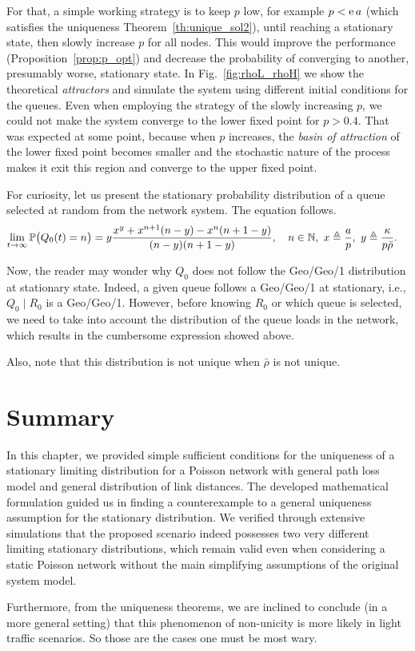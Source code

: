 For that, a simple working strategy is to keep $p$ low, for example $p < \mathrm{e}\,a$ (which satisfies the uniqueness Theorem~\ref{th:unique_sol2}), until reaching a stationary state, then slowly increase $p$ for all nodes. This would improve the performance (Proposition~\ref{prop:p_opt}) and decrease the probability of converging to another, presumably worse, stationary state.
%
In Fig.~\ref{fig:rhoL_rhoH} we show the theoretical \textit{attractors} and simulate the system using different initial conditions for the queues.
%
Even when employing the strategy of the slowly increasing $p$, we could not make the system converge to the lower fixed point for $p > 0.4$.
%
That was expected at some point, because when $p$ increases, the \textit{basin of attraction} of the lower fixed point becomes smaller and the stochastic nature of the process makes it exit this region and converge to the upper fixed point. %

\begin{note}
    For curiosity, let us present the stationary probability distribution of a queue selected at random from the network system. %
    The equation follows.
    \begin{align*}
        \lim_{t\to\infty}{\mathbb P}\big(Q_0(t) = n\big) &= y \frac{x^y + x^{n+1}(n-y) - x^n (n+1-y)}{(n-y)(n+1-y)}, \quad n\in{\mathbb N},~ x \triangleq \frac{a}{p}, ~ y \triangleq \frac{\kappa}{p\bar\rho}.
    \end{align*}
    
    Now, the reader may wonder why $Q_0$ does not follow the Geo/Geo/1 distribution at stationary state.
    Indeed, a given queue follows a Geo/Geo/1 at stationary, i.e., $Q_0 \mid R_0$ is a Geo/Geo/1.
    However, before knowing $R_0$ or which queue is selected, we need to take into account the distribution of the queue loads in the network, which results in the cumbersome expression showed above.
    
    Also, note that this distribution is not unique when $\bar\rho$ is not unique.
\end{note}

\section{Summary} \label{sec:summ_P2_04}

In this chapter, we provided simple sufficient conditions for the uniqueness of a stationary limiting distribution for a Poisson network with general path loss model and general distribution of link distances.
%
The developed mathematical formulation guided us in finding a counterexample to a general uniqueness assumption for the stationary distribution.
%
We verified through extensive simulations that the proposed scenario indeed possesses two very different limiting stationary distributions, which remain valid even when considering a static Poisson network without the main simplifying assumptions of the original system model.

Furthermore, from the uniqueness theorems, we are inclined to conclude (in a more general setting) that this phenomenon of non-unicity is more likely in light traffic scenarios.
%
So those are the cases one must be most wary.
